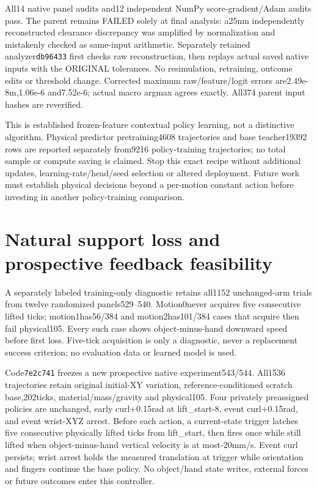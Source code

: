 \documentclass[10pt]{article}
\begin{document}
All14 native panel audits and12 independent NumPy score-gradient/Adam audits
pass. The parent remains FAILED solely at final analysis: a25nm independently
reconstructed clearance discrepancy was amplified by normalization and mistakenly
checked as same-input arithmetic. Separately retained analyzer\texttt{db96433}
first checks raw reconstruction, then replays actual saved native inputs with the
ORIGINAL tolerances. No resimulation, retraining, outcome edits or threshold
change. Corrected maximum raw/feature/logit errors are2.49e-8m,1.06e-6 and7.52e-6;
actual macro argmax agrees exactly. All374 parent input hashes are reverified.

This is established frozen-feature contextual policy learning, not a distinctive
algorithm. Physical predictor pretraining4608 trajectories and base teacher19392
rows are reported separately from9216 policy-training trajectories; no total
sample or compute saving is claimed. Stop this exact recipe without additional
updates, learning-rate/head/seed selection or altered deployment. Future work
must establish physical decisions beyond a per-motion constant action before
investing in another policy-training comparison.


\section{Natural support loss and prospective feedback feasibility}
A separately labeled training-only diagnostic retains all1152 unchanged-arm
trials from twelve randomized panels529--540. Motion0never acquires five
consecutive lifted ticks; motion1has56/384 and motion2has101/384 cases that
acquire then fail physical105. Every such case shows object-minus-hand downward
speed before first loss. Five-tick acquisition is only a diagnostic, never a
replacement success criterion; no evaluation data or learned model is used.

Code\texttt{7e2c741} freezes a new prospective native experiment543/544. All1536
trajectories retain original initial-XY variation, reference-conditioned scratch
base,202ticks, material/mass/gravity and physical105. Four privately preassigned
policies are unchanged, early curl+0.15rad at lift_start-8, event curl+0.15rad,
and event wrist-XYZ arrest. Before each action, a current-state trigger latches
five consecutive physically lifted ticks from lift_start, then fires once while
still lifted when object-minus-hand vertical velocity is at most-20mm/s. Event
curl persists; wrist arrest holds the measured translation at trigger while
orientation and fingers continue the base policy. No object/hand state writes,
external forces or future outcomes enter this controller.
\end{document}

